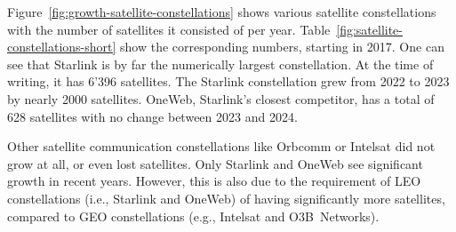 Figure~\ref{fig:growth-satellite-constellations} shows various satellite
constellations with the number of satellites it consisted of per year.
Table~\ref{fig:satellite-constellations-short} show the corresponding numbers,
starting in 2017. One can see that Starlink is by far the numerically largest
constellation. At the time of writing, it has 6'396 satellites. The Starlink
constellation grew from 2022 to 2023 by nearly 2000 satellites. OneWeb,
Starlink's closest competitor, has a total of 628 satellites with no change
between 2023 and 2024.

Other satellite communication constellations like Orbcomm or Intelsat did not
grow at all, or even lost satellites. Only Starlink and OneWeb see significant
growth in recent years. However, this is also due to the requirement of LEO
constellations (i.e., Starlink and OneWeb) of having significantly more
satellites, compared to GEO constellations (e.g., Intelsat and O3B~Networks).
